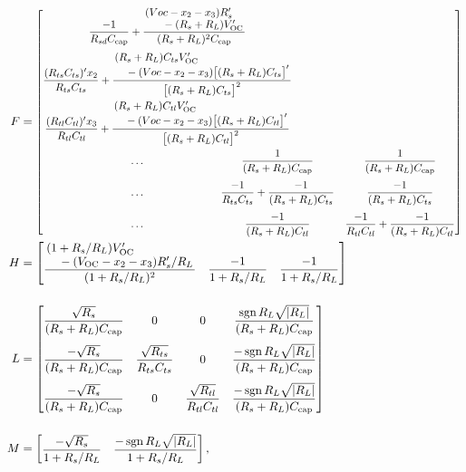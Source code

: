 \documentclass[../zhang_thesis.tex]{subfiles}
\begin{document}
\begin{align}
    F & = \scalemath{0.9}{ \left[ \begin{multlined} \begin{array}{@{}c}
        \dfrac{-1}{R_{sd}C_\text{cap}} + \dfrac{\splitfrac{(Voc-x_2-x_3)R_s'}{- (R_s+R_L)V_\text{OC}'}}{(R_s+R_L)^2 C_\text{cap}} \\[3ex]
        \dfrac{(R_{ts}C_{ts})' x_2}{R_{ts}C_{ts}} + \dfrac{\splitfrac{(R_s+R_L)C_{ts}V_\text{OC}'}{- (Voc-x_2-x_3)\big[(R_s+R_L)C_{ts}\big]'}}{\big[(R_s+R_L)C_{ts}\big]^2}  \\[3ex]
        \dfrac{(R_{tl}C_{tl})' x_3}{R_{tl}C_{tl}} + \dfrac{\splitfrac{(R_s+R_L)C_{tl}V_\text{OC}'}{- (Voc-x_2-x_3)\big[(R_s+R_L)C_{tl}\big]'}}{\big[(R_s+R_L)C_{tl}\big]^2} 
        \end{array} \\
        \begin{array}{@{\hspace{1in}\ldots\hspace{1in}}cc@{}}
            \dfrac{1}{(R_s+R_L)C_\text{cap}} & \dfrac{1}{(R_s+R_L)C_\text{cap}} \\[3ex]
            \dfrac{-1}{R_{ts}C_{ts}}+\dfrac{-1}{(R_s+R_L)C_{ts}} & \dfrac{-1}{(R_s+R_L)C_{ts}} \\[3ex]
            \dfrac{-1}{(R_s+R_L)C_{tl}} & \dfrac{-1}{R_{tl}C_{tl}}+\dfrac{-1}{(R_s+R_L)C_{tl}}
        \end{array} \end{multlined} \right] } \\
    H & = \begin{bmatrix}
            \dfrac{\splitfrac{(1+R_s/R_L)V_\text{OC}'}{- (V_\text{OC}-x_2-x_3)R_s'/R_L}}{(1+R_s/R_L)^2} & \dfrac{-1}{1+R_s/R_L} & \dfrac{-1}{1+R_s/R_L}
        \end{bmatrix} \\[3ex]
    L & = \begin{bmatrix}
            \dfrac{\sqrt{R_s}}{(R_s+R_L)C_\text{cap}} & 0 & 0 & \dfrac{\sgn{R_L}\sqrt{|R_L|}}{(R_s+R_L)C_\text{cap}} \\[3ex]
            \dfrac{-\sqrt{R_s}}{(R_s+R_L)C_\text{cap}} & \dfrac{\sqrt{R_{ts}}}{R_{ts}C_{ts}} & 0 & \dfrac{-\sgn{R_L}\sqrt{|R_L|}}{(R_s+R_L)C_\text{cap}} \\[3ex]
            \dfrac{-\sqrt{R_s}}{(R_s+R_L)C_\text{cap}} & 0 & \dfrac{\sqrt{R_{tl}}}{R_{tl}C_{tl}} & \dfrac{-\sgn{R_L}\sqrt{|R_L|}}{(R_s+R_L)C_\text{cap}}
        \end{bmatrix} \\[3ex]
    M & = \begin{bmatrix}
            \dfrac{-\sqrt{R_s}}{1+R_s/R_L} & \dfrac{-\sgn{R_L}\sqrt{|R_L|}}{1+R_s/R_L}
        \end{bmatrix} ,
\end{align}
\end{document}
